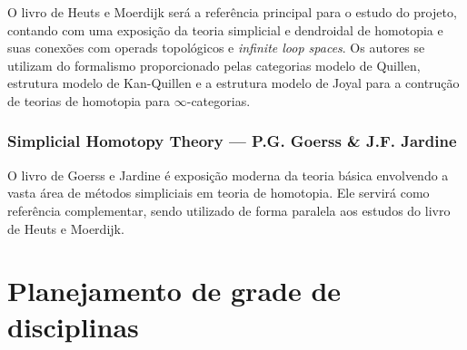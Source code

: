 \documentclass[11pt,reqno]{amsart}
\theoremstyle{definition}
\begin{document}
O livro de Heuts e Moerdijk será a referência principal para o estudo do
projeto, contando com uma exposição da teoria simplicial e dendroidal de
homotopia e suas conexões com operads topológicos e \textit{infinite loop
spaces}. Os autores se utilizam do formalismo proporcionado pelas categorias
modelo de Quillen, estrutura modelo de Kan-Quillen e a estrutura modelo de Joyal
para a contrução de teorias de homotopia para \(\infty\)-categorias.

\subsubsection{%
  \textbf{Simplicial Homotopy Theory}
  --- P.G. Goerss \& J.F. Jardine~\cite{GoeJar09}
}

O livro de Goerss e Jardine é exposição moderna da teoria básica envolvendo a
vasta área de métodos simpliciais em teoria de homotopia. Ele servirá como
referência complementar, sendo utilizado de forma paralela aos estudos do
livro de Heuts e Moerdijk.

\appendix

\section{Planejamento de grade de disciplinas}\label{sec:disciplinas}
\end{document}
